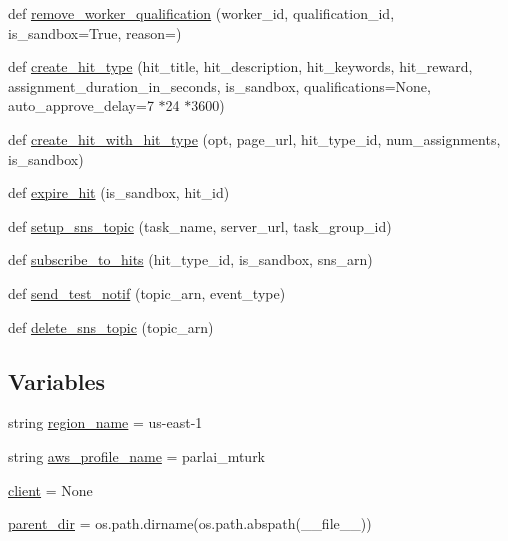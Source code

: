\begin{DoxyCompactItemize}
\item 
def \hyperlink{namespaceparlai_1_1mturk_1_1core_1_1dev_1_1mturk__utils_abc2c057b91641179f7c4bb50dd916488}{remove\+\_\+worker\+\_\+qualification} (worker\+\_\+id, qualification\+\_\+id, is\+\_\+sandbox=True, reason=\textquotesingle{}\textquotesingle{})
\item 
def \hyperlink{namespaceparlai_1_1mturk_1_1core_1_1dev_1_1mturk__utils_acd08d4459a8231afa32daccd82c5c957}{create\+\_\+hit\+\_\+type} (hit\+\_\+title, hit\+\_\+description, hit\+\_\+keywords, hit\+\_\+reward, assignment\+\_\+duration\+\_\+in\+\_\+seconds, is\+\_\+sandbox, qualifications=None, auto\+\_\+approve\+\_\+delay=7 $\ast$24 $\ast$3600)
\item 
def \hyperlink{namespaceparlai_1_1mturk_1_1core_1_1dev_1_1mturk__utils_a471ced1f7df897dcf3414dd49b84ddeb}{create\+\_\+hit\+\_\+with\+\_\+hit\+\_\+type} (opt, page\+\_\+url, hit\+\_\+type\+\_\+id, num\+\_\+assignments, is\+\_\+sandbox)
\item 
def \hyperlink{namespaceparlai_1_1mturk_1_1core_1_1dev_1_1mturk__utils_a26e9e405bc015ef647ef58a133c88f40}{expire\+\_\+hit} (is\+\_\+sandbox, hit\+\_\+id)
\item 
def \hyperlink{namespaceparlai_1_1mturk_1_1core_1_1dev_1_1mturk__utils_a01315ef04ead23e4c1a84c027dcccf3f}{setup\+\_\+sns\+\_\+topic} (task\+\_\+name, server\+\_\+url, task\+\_\+group\+\_\+id)
\item 
def \hyperlink{namespaceparlai_1_1mturk_1_1core_1_1dev_1_1mturk__utils_a06d86a6c70c953fda4ae13db4d43bc79}{subscribe\+\_\+to\+\_\+hits} (hit\+\_\+type\+\_\+id, is\+\_\+sandbox, sns\+\_\+arn)
\item 
def \hyperlink{namespaceparlai_1_1mturk_1_1core_1_1dev_1_1mturk__utils_abfc17443a7c8018fc56dcc058e7b86f1}{send\+\_\+test\+\_\+notif} (topic\+\_\+arn, event\+\_\+type)
\item 
def \hyperlink{namespaceparlai_1_1mturk_1_1core_1_1dev_1_1mturk__utils_aa321f5dc5e9700bc3906fca85490e25e}{delete\+\_\+sns\+\_\+topic} (topic\+\_\+arn)
\end{DoxyCompactItemize}
\subsection*{Variables}
\begin{DoxyCompactItemize}
\item 
string \hyperlink{namespaceparlai_1_1mturk_1_1core_1_1dev_1_1mturk__utils_a80d4af773d771a7d737aedd44d633d7f}{region\+\_\+name} = \textquotesingle{}us-\/east-\/1\textquotesingle{}
\item 
string \hyperlink{namespaceparlai_1_1mturk_1_1core_1_1dev_1_1mturk__utils_ad221229123682daefccc47fe5e8052da}{aws\+\_\+profile\+\_\+name} = \textquotesingle{}parlai\+\_\+mturk\textquotesingle{}
\item 
\hyperlink{namespaceparlai_1_1mturk_1_1core_1_1dev_1_1mturk__utils_a09d7c0fc880089c5194ddc68af118f15}{client} = None
\item 
\hyperlink{namespaceparlai_1_1mturk_1_1core_1_1dev_1_1mturk__utils_a5813bb15ba851c7bbbf0871a7979720d}{parent\+\_\+dir} = os.\+path.\+dirname(os.\+path.\+abspath(\+\_\+\+\_\+file\+\_\+\+\_\+))
\end{DoxyCompactItemize}


